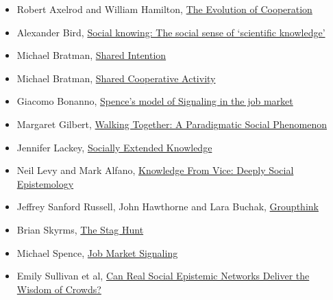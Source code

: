 \documentclass[
]{article}
\providecommand{\tightlist}{%
  \setlength{\itemsep}{0pt}\setlength{\parskip}{0pt}}
\begin{document}
\begin{itemize}
\tightlist
\item
  Robert Axelrod and William Hamilton,
  \href{http://www-personal.umich.edu/~axe/research/Axelrod\%20and\%20Hamilton\%20EC\%201981.pdf}{The
  Evolution of Cooperation}
\item
  Alexander Bird, \href{https://philpapers.org/rec/BIRSKT}{Social
  knowing: The social sense of `scientific knowledge'}
\item
  Michael Bratman, \href{https://philpapers.org/rec/BRASI}{Shared
  Intention}
\item
  Michael Bratman, \href{https://philpapers.org/rec/BRASCA}{Shared
  Cooperative Activity}
\item
  Giacomo Bonanno,
  \href{http://faculty.econ.ucdavis.edu/faculty/bonanno/teaching/200C/Signaling.pdf}{Spence's
  model of Signaling in the job market}
\item
  Margaret Gilbert, \href{https://philpapers.org/rec/GILWTA}{Walking
  Together: A Paradigmatic Social Phenomenon}
\item
  Jennifer Lackey, \href{https://philpapers.org/rec/LACSEK}{Socially
  Extended Knowledge}
\item
  Neil Levy and Mark Alfano,
  \href{https://philpapers.org/rec/LEVKFV}{Knowledge From Vice: Deeply
  Social Epistemology}
\item
  Jeffrey Sanford Russell, John Hawthorne and Lara Buchak,
  \href{https://philpapers.org/rec/RUSG}{Groupthink}
\item
  Brian Skyrms, \href{https://www.jstor.org/stable/3218711}{The Stag
  Hunt}
\item
  Michael Spence, \href{https://www.jstor.org/stable/1882010?seq=1}{Job
  Market Signaling}
\item
  Emily Sullivan et al,
  \href{https://philarchive.org/archive/SULCRS}{Can Real Social
  Epistemic Networks Deliver the Wisdom of Crowds?}
\end{itemize}
\end{document}
